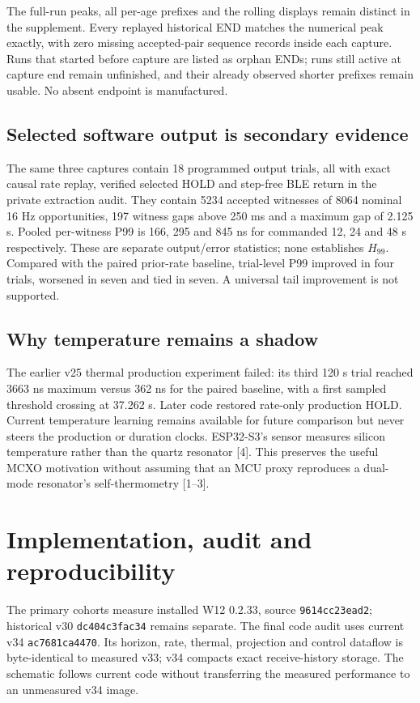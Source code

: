 \documentclass[11pt,letterpaper]{article}
\newcommand{\code}[1]{\texttt{\small #1}}
\begin{document}
The full-run peaks, all per-age prefixes and the rolling displays remain distinct in the supplement. Every replayed historical END matches the numerical peak exactly, with zero missing accepted-pair sequence records inside each capture. Runs that started before capture are listed as orphan ENDs; runs still active at capture end remain unfinished, and their already observed shorter prefixes remain usable. No absent endpoint is manufactured.

\subsection{Selected software output is secondary evidence}
The same three captures contain 18 programmed output trials, all with exact causal rate replay, verified selected HOLD and step-free BLE return in the private extraction audit. They contain 5234 accepted witnesses of 8064 nominal 16 Hz opportunities, 197 witness gaps above 250 ms and a maximum gap of 2.125 s. Pooled per-witness P99 is 166, 295 and 845 ns for commanded 12, 24 and 48 s respectively. These are separate output/error statistics; none establishes $H_{99}$. Compared with the paired prior-rate baseline, trial-level P99 improved in four trials, worsened in seven and tied in seven. A universal tail improvement is not supported.

\subsection{Why temperature remains a shadow}
The earlier v25 thermal production experiment failed: its third 120 s trial reached 3663 ns maximum versus 362 ns for the paired baseline, with a first sampled threshold crossing at 37.262 s. Later code restored rate-only production HOLD. Current temperature learning remains available for future comparison but never steers the production or duration clocks. ESP32-S3's sensor measures silicon temperature rather than the quartz resonator [4]. This preserves the useful MCXO motivation without assuming that an MCU proxy reproduces a dual-mode resonator's self-thermometry [1--3].
\newpage
\section{Implementation, audit and reproducibility}
The primary cohorts measure installed W12 0.2.33, source \code{9614cc23ead2}; historical v30 \code{dc404c3fac34} remains separate. The final code audit uses current v34 \code{ac7681ca4470}. Its horizon, rate, thermal, projection and control dataflow is byte-identical to measured v33; v34 compacts exact receive-history storage. The schematic follows current code without transferring the measured performance to an unmeasured v34 image.
\end{document}
